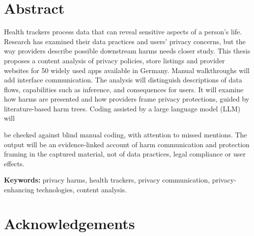 \documentclass[twoside,its]{bossthesis}
\author{\authorname}
\title{\thesistitle}
\institute{\thechair}
\makeatletter
\newif\ifshowhighlights
\def\hl@ulpreamble{\SOUL@hlpreamble
  \hl@lnht=-\SOUL@uldp \advance\hl@lnht by \hl@lnthick}
\def\hl@ulleaders{\xleaders\hbox to 1pt{%
  \rlap{\vrule width 1.2pt height \SOUL@ulht depth \SOUL@uldp}%
  \rlap{\textcolor{todoline}{\vrule width 1.2pt height \hl@lnht depth \SOUL@uldp}}\hss}}
\DeclareRobustCommand*\texthlul{\SOUL@hlsetup
  \let\SOUL@preamble\hl@ulpreamble \let\SOUL@ulleaders\hl@ulleaders \SOUL@}
\newcommand{\hl@plain}[2]{{\sethlcolor{#1}\hl{#2}}}
\newcommand{\hl@marked}[2]{{\sethlcolor{#1}\texthlul{#2}}}
\newcommand{\hl@off}[2]{#2}
\newcommand{\hl@on}[2]{\@ifnextchar\todo{\hl@marked{#1}{#2}}{\hl@plain{#1}{#2}}}
\newcommand{\highlight}[2][yellow]{%
  \ifshowhighlights
    \expandafter\hl@on %
  \else
    \expandafter\hl@off
  \fi
  {#1}{#2}}
\makeatother
\begin{document}
\pagestyle{fancy}

\maketitle

\chapter*{Abstract}

Health trackers process data that can reveal sensitive aspects of
a person's life. Research has examined their data practices and users' privacy
concerns, but the way providers describe possible downstream harms needs
closer study. This thesis proposes a content analysis of privacy policies,
store listings and provider websites for 50 widely used apps available in
Germany. Manual walkthroughs will add interface communication.
The analysis will distinguish descriptions of data flows, capabilities such as
inference, and consequences for users. It will examine how harms are presented
and how providers frame privacy protections, guided by literature-based harm
trees.
Coding assisted by a large language model (LLM) will \highlight[orange!15]{be checked against blind
manual coding, with attention to missed mentions. The output will be an
evidence-linked account of harm communication and protection framing in the
captured material, not of data practices, legal compliance or user effects.}

\noindent\textbf{Keywords:} privacy harms, health trackers, privacy communication, privacy-enhancing technologies, content analysis.



\cleardoublepage
\chapter*{Acknowledgements}

\cleardoublepage
\tableofcontents

\cleardoublepage
{}
\end{document}
